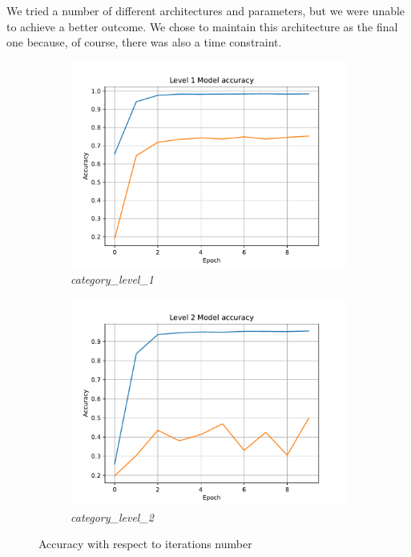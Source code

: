 We tried a number of different architectures and parameters, but we were unable to achieve a better outcome. We chose to maintain this architecture as the final one because, of course, there was also a time constraint.

\begin{figure}[htpb]
	\centering
	\begin{subfigure}{0.48\linewidth}
		\centering
		\includegraphics[width=\linewidth]{Images/level_1_epoch_accuracy.pdf}
		\caption{\textit{category\_level\_1}}
		\label{fig:epoch_vs_accuracy_level_1}
	\end{subfigure}
	\begin{subfigure}{0.48\linewidth}
		\centering
		\includegraphics[width=\linewidth]{Images/level_2_epoch_accuracy.pdf}
		\caption{\textit{category\_level\_2}}
		\label{fig:epoch_vs_accuracy_level_2}
	\end{subfigure}
	\caption{Accuracy with respect to iterations number}
	\label{fig:epocs_vs_accuracy}
\end{figure}

